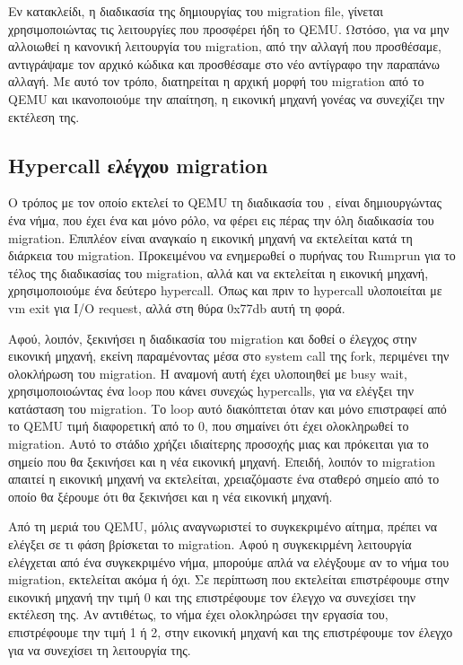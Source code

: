 Εν κατακλείδι, η διαδικασία της δημιουργίας του migration file, γίνεται
χρησιμοποιώντας τις λειτουργίες που προσφέρει ήδη το QEMU. Ωστόσο, για να μην
αλλοιωθεί η κανονική λειτουργία του migration, από την αλλαγή που προσθέσαμε,
αντιγράψαμε τον αρχικό κώδικα και προσθέσαμε στο νέο αντίγραφο την παραπάνω
αλλαγή. Με αυτό τον τρόπο, διατηρείται η αρχική μορφή του migration από το QEMU
και ικανοποιούμε την απαίτηση, η εικονική μηχανή γονέας να συνεχίζει την
εκτέλεση της. 

\subsection{Hypercall ελέγχου migration}

Ο τρόπος με τον οποίο εκτελεί το QEMU τη διαδικασία του , είναι
δημιουργώντας ένα νήμα, που έχει ένα και μόνο ρόλο, να φέρει εις πέρας την όλη
διαδικασία του migration. Επιπλέον είναι αναγκαίο η εικονική μηχανή να εκτελείται
κατά τη διάρκεια του migration. Προκειμένου να ενημερωθεί ο πυρήνας του Rumprun
για το τέλος της διαδικασίας του migration, αλλά και να εκτελείται η εικονική
μηχανή, χρησιμοποιούμε ένα δεύτερο hypercall. Όπως και πριν το hypercall
υλοποιείται με vm exit για Ι/Ο request, αλλά στη θύρα 0x77db αυτή τη φορά. 

Αφού, λοιπόν, ξεκινήσει η διαδικασία του migration και δοθεί ο έλεγχος στην
εικονική μηχανή, εκείνη παραμένοντας μέσα στο system call της fork, περιμένει
την ολοκλήρωση του migration. Η αναμονή αυτή έχει υλοποιηθεί με busy wait,
χρησιμοποιοώντας ένα loop που κάνει συνεχώς hypercalls, για να ελέγξει την
κατάσταση του migration. Το loop αυτό διακόπτεται όταν και μόνο επιστραφεί
από το QEMU τιμή διαφορετική από το 0, που σημαίνει ότι έχει ολοκληρωθεί το
migration. Αυτό το στάδιο χρήζει ιδιαίτερης προσοχής μιας και πρόκειται για το
σημείο που θα ξεκινήσει και η νέα εικονική μηχανή. Επειδή, λοιπόν το migration
απαιτεί η εικονική μηχανή να εκτελείται, χρειαζόμαστε ένα σταθερό σημείο από
το οποίο θα ξέρουμε ότι θα ξεκινήσει και η νέα εικονική μηχανή.

Από τη μεριά του QEMU, μόλις αναγνωριστεί το συγκεκριμένο αίτημα, πρέπει να
ελέγξει σε τι φάση βρίσκεται το migration. Αφού η συγκεκιρμένη λειτουργία
ελέγχεται από ένα συγκεκριμένο νήμα, μπορούμε απλά να ελέγξουμε αν το νήμα του
migration, εκτελείται ακόμα ή όχι. Σε περίπτωση που εκτελείται επιστρέφουμε στην
εικονική μηχανή την τιμή 0 και της επιστρέφουμε τον έλεγχο να συνεχίσει την
εκτέλεση της. Αν αντιθέτως, το νήμα έχει ολοκληρώσει την εργασία του,
επιστρέφουμε την τιμή 1 ή 2, στην εικονική μηχανή και της επιστρέφουμε τον
έλεγχο για να συνεχίσει τη λειτουργία της. 

